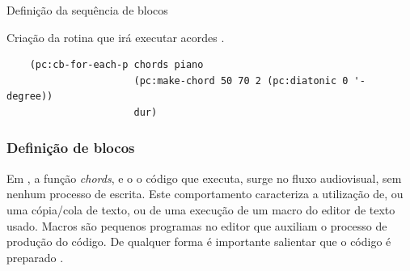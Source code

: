 \begin{example}{Definição da sequência de blocos}\label{fig:SIK_acorde}

Criação da rotina que irá executar acordes \cite{sorensen_youtube_2014}.

  \begin{verbatim}
    (pc:cb-for-each-p chords piano
                      (pc:make-chord 50 70 2 (pc:diatonic 0 '- degree))
                      dur)
  \end{verbatim}
\end{example}

\subsubsection*{Definição de blocos}\label{sec:define_chords}

Em , a função \emph{chords}, e o o código que executa, surge no fluxo audiovisual, sem nenhum processo de escrita. Este comportamento caracteriza a utilização de, ou uma cópia/cola de texto, ou de uma execução de um macro do editor de texto usado. Macros são pequenos programas no editor que auxiliam o processo de produção do código. De qualquer forma é importante salientar que o código é preparado \cite{sorensen_youtube_2014}.

